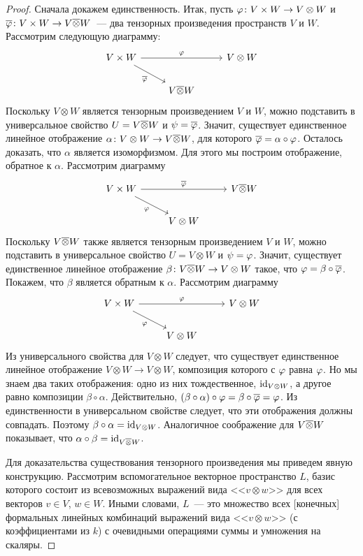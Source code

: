 \begin{proof}
Сначала докажем единственность. Итак, пусть $\varphi\colon V\times W\to
V\otimes W$ и $\overline{\varphi}\colon V\times W\to V\overline\otimes W$~--- два
тензорных произведения пространств $V$ и $W$. Рассмотрим следующую
диаграмму:
$$
\begin{tikzcd}
V\times W\arrow{rr}{\ph} \arrow{rd}[swap]{\ol\ph} & &
V\otimes W \\
& V\ol\otimes W
\end{tikzcd}
$$
Поскольку $V\otimes W$ является тензорным произведением $V$ и $W$,
можно подставить в универсальное свойство $U = V\overline\otimes W$ и $\psi
= \overline{\varphi}$. Значит, существует единственное линейное отображение
$\alpha\colon V\otimes W\to V\overline\otimes W$, для которого $\overline{\varphi} =
\alpha\circ\varphi$. Осталось доказать, что $\alpha$ является
изоморфизмом. Для этого мы построим отображение, обратное к
$\alpha$. Рассмотрим диаграмму
$$
\begin{tikzcd}
V\times W \arrow{rr}{\ol\ph} \arrow{rd}[swap]{\ph} & &
V\ol\otimes W \\
& V\otimes W
\end{tikzcd}
$$
Поскольку $V\overline\otimes W$ также является тензорным произведением $V$ и
$W$, можно подставить в универсальное свойство $U = V\otimes W$ и
$\psi = \varphi$. Значит, существует единственное линейное отображение
$\beta\colon V\overline\otimes W\to V\otimes W$ такое, что
$\varphi = \beta\circ\overline{\varphi}$. Покажем, что $\beta$ является обратным к
$\alpha$.
Рассмотрим диаграмму
$$
\begin{tikzcd}
V\times W \arrow{rr}{\ph} \arrow{rd}[swap]{\ph} & & V\otimes W\\
& V\otimes W
\end{tikzcd}
$$
Из универсального свойства для $V\otimes W$ следует, что существует
единственное линейное отображение $V\otimes W\to V\otimes W$,
композиция которого с $\varphi$ равна $\varphi$. Но мы знаем два таких
отображения: одно из них тождественное, $\operatorname{id}_{V\otimes W}$, а другое
равно композиции $\beta\circ\alpha$. Действительно,
$(\beta\circ\alpha)\circ\varphi = \beta\circ\overline{\varphi} = \varphi$.
Из единственности в универсальном свойстве следует, что эти
отображения должны совпадать. Поэтому $\beta\circ\alpha =
\operatorname{id}_{V\otimes W}$. Аналогичное соображение для $V\overline\otimes W$
показывает, что $\alpha\circ\beta = \operatorname{id}_{V\overline\otimes W}$.

Для доказательства существования тензорного произведения мы приведем
явную конструкцию.
Рассмотрим вспомогательное векторное пространство $L$, базис
которого состоит из всевозможных выражений вида <<$v\otimes w$>> для
всех векторов $v\in V$, $w\in W$. Иными словами, $L$~--- это множество
всех [конечных] формальных линейных комбинаций выражений вида
<<$v\otimes w$>> (с коэффициентами из $k$) с очевидными операциями
суммы и умножения на скаляры.


\end{proof}
